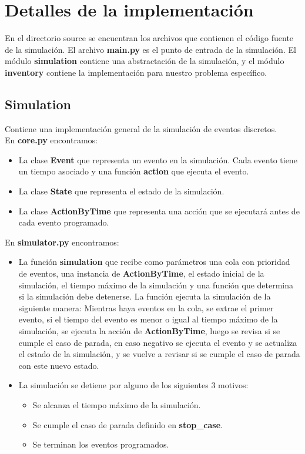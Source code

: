 \documentclass{article}
\begin{document}
\section*{Detalles de la implementación}

En el directorio source se encuentran los archivos que contienen el código fuente de la simulación. El archivo \textbf{main.py}
es el punto de entrada de la simulación.
El módulo \textbf{simulation} contiene una abstractación de la simulación, y el módulo \textbf{inventory} contiene la implementación
para nuestro problema específico.

\subsection*{Simulation}

Contiene una implementación general de la simulación de eventos discretos.\\

En \textbf{core.py} encontramos:

\begin{itemize}
    \item La clase \textbf{Event} que representa un evento en la simulación. Cada evento tiene un tiempo asociado y una función \textbf{action} que ejecuta el evento.
    \item La clase \textbf{State} que representa el estado de la simulación.
    \item La clase \textbf{ActionByTime} que representa una acción que se ejecutará antes de cada evento programado.
\end{itemize}

En \textbf{simulator.py} encontramos:

\begin{itemize}
    \item La función \textbf{simulation} que recibe como parámetros una cola con prioridad de eventos, una instancia de \textbf{ActionByTime},
  el estado
  inicial de la simulación, el tiempo máximo de la simulación y una función que determina si la simulación debe
  detenerse. La función ejecuta la simulación de la siguiente manera:
  Mientras haya eventos en la cola, se extrae el primer evento, si el tiempo del evento es menor o igual al tiempo
  máximo de la simulación, se ejecuta la acción de \textbf{ActionByTime}, luego se revisa si se cumple el caso de parada, en caso
  negativo se ejecuta el evento y se actualiza el estado de la simulación, y se vuelve a revisar si se cumple el caso de
  parada con este nuevo estado.
    \item La simulación se detiene por alguno de los siguientes 3 motivos:
    \begin{itemize}
        \item Se alcanza el tiempo máximo de la simulación.
        \item Se cumple el caso de parada definido en \textbf{stop\_case}.
        \item Se terminan los eventos programados.
    \end{itemize}
\end{itemize}
\end{document}
